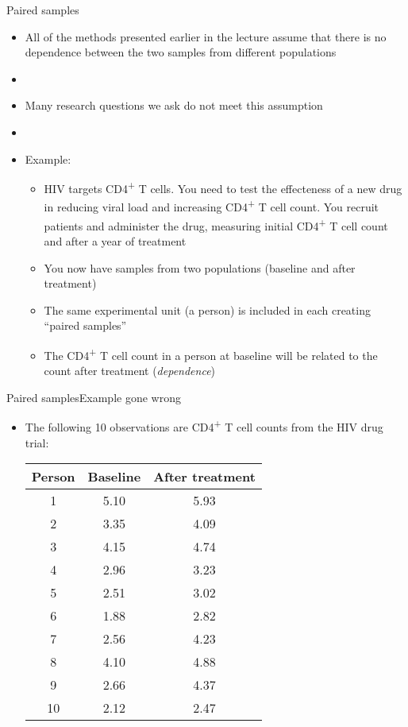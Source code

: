 \documentclass[xcolor=dvipsnames]{beamer}
\begin{document}
\begin{frame}{Paired samples}
\begin{itemize}
	\item All of the methods presented earlier in the lecture assume that there is no dependence between the two samples from different populations
	\item[]
	\item Many research questions we ask do not meet this assumption
	\item[]
	\item Example: 
	\begin{itemize}
		\item HIV targets CD4\textsuperscript{+} T cells. You need to test the effecteness of a new drug in reducing viral load and increasing CD4\textsuperscript{+} T cell count. You recruit patients and administer the drug, measuring initial CD4\textsuperscript{+} T cell count and after a year of treatment
		\item You now have samples from two populations (baseline and after treatment)
		\item The same experimental unit (a person) is included in each creating ``paired samples''
		\item The CD4\textsuperscript{+} T cell count in a person at baseline will be related to the count after treatment (\emph{dependence})
	\end{itemize}
\end{itemize}
\end{frame}

\begin{frame}{Paired samples}{Example gone wrong}
	\begin{itemize}
		\item The following 10 observations are CD4\textsuperscript{+} T cell counts from the HIV drug trial:
		\begin{center}
	\begin{tabular}{|c|c|c|}
		\hline
		\textbf{Person} & \textbf{Baseline} &  \textbf{After treatment} \\ \hline \hline
		1  &    5.10 &   5.93  \\ \hline 
		2  &    3.35 &   4.09 \\ \hline 
		3  &   4.15  &  4.74  \\ \hline 
		4  &   2.96  &  3.23  \\ \hline 
		5  &    2.51 &   3.02 \\ \hline 
		6  &   1.88  &  2.82  \\ \hline 
		7  &   2.56  &  4.23 \\ \hline 
		8  &    4.10 &   4.88 \\ \hline 
		9  &   2.66  &  4.37  \\ \hline 
		10  &    2.12  &  2.47 \\ \hline 
	\end{tabular}
		\end{center}
	\end{itemize}
\end{frame}
\end{document}
